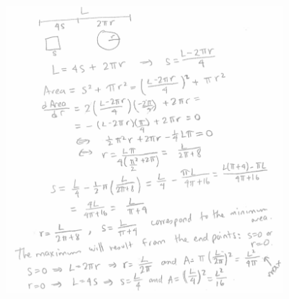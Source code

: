 \begin{enumerate}
    \begin{center}
			\includegraphics[width=0.8\textwidth]{images/ImgWS10Wire.png} 
	\end{center}     
\end{enumerate}
    
    
    